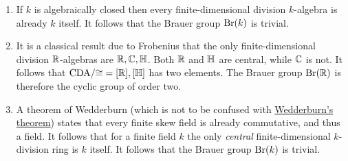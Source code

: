 \begin{example}
  \leavevmode
  \begin{enumerate}
    \item
      If $k$ is algebraically closed then every finite-dimensional division $k$-algebra is already $k$ itself.
      It follows that the Brauer group $\operatorname{Br}(k)$ is trivial.
    \item
      It is a classical result due to Frobenius that the only finite-dimensional division $\mathbb{R}$-algebras are $\mathbb{R}, \mathbb{C}, \mathbb{H}$.
      Both $\mathbb{R}$ and $\mathbb{H}$ are central, while $\mathbb{C}$ is not.
      It follows that $\operatorname{CDA}\!/{\cong} = {[\mathbb{R}], [\mathbb{H}]}$ has two elements.
      The Brauer group $\operatorname{Br}(\mathbb{R})$ is therefore the cyclic group of order two.
    \item
      A theorem of Wedderburn (which is not to be confused with \hyperref[theorem: wedderburns theorem]{Wedderburn’s theorem}) states that every finite skew field is already commutative, and thus a field.
      It follows that for a finite field $k$ the only \emph{central} finite-dimensional $k$-division ring is $k$ itself.
      It follows that the Brauer group $\operatorname{Br}(k)$ is trivial.
  \end{enumerate}
\end{example}




